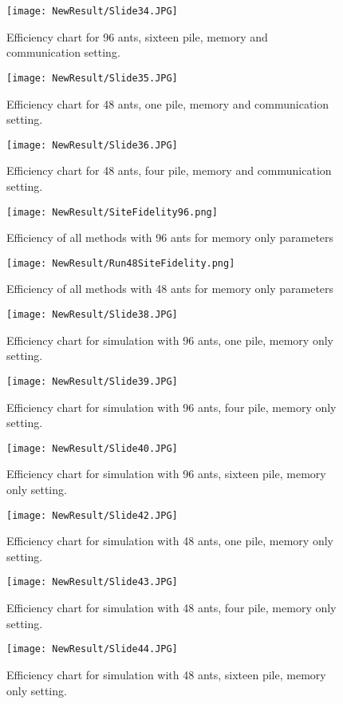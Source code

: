 \begin{figure}[h]
	\texttt{[image: NewResult/Slide34.JPG]}
	\caption{Efficiency chart for 96 ants, sixteen pile,  memory and communication setting.}
\end{figure}
\begin{figure}[h]
	\texttt{[image: NewResult/Slide35.JPG]}
	\caption{Efficiency chart for 48 ants, one pile,  memory and communication setting.}
\end{figure}
\begin{figure}[h]
	\texttt{[image: NewResult/Slide36.JPG]}
	\caption{Efficiency chart for 48 ants, four pile,  memory and communication setting.}
\end{figure}
\begin{figure}
	\texttt{[image: NewResult/SiteFidelity96.png]}
	\caption{Efficiency of all methods with 96 ants for memory only parameters}
\end{figure}

\begin{figure}
	\texttt{[image: NewResult/Run48SiteFidelity.png]}
	\caption{Efficiency of all methods with 48 ants for memory only parameters}
\end{figure}
\begin{figure}[h]
	\texttt{[image: NewResult/Slide38.JPG]}
	\caption{Efficiency chart for simulation with 96 ants, one pile,  memory only setting.}
\end{figure}
\begin{figure}[h]
	\texttt{[image: NewResult/Slide39.JPG]}
	\caption{Efficiency chart for simulation with 96 ants, four pile,  memory only setting.}
\end{figure}
\begin{figure}[h]
	\texttt{[image: NewResult/Slide40.JPG]}
	\caption{Efficiency chart for simulation with 96 ants, sixteen pile,  memory only setting.}
\end{figure}
\begin{figure}[h]
	\texttt{[image: NewResult/Slide42.JPG]}
	\caption{Efficiency chart for simulation with 48 ants, one pile,  memory only setting.}
\end{figure}
\begin{figure}[h]
	\texttt{[image: NewResult/Slide43.JPG]}
	\caption{Efficiency chart for simulation with 48 ants, four pile,  memory only setting.}
\end{figure}
\begin{figure}[h]
	\texttt{[image: NewResult/Slide44.JPG]}
	\caption{Efficiency chart for simulation with 48 ants, sixteen pile,  memory only setting.}
\end{figure}

